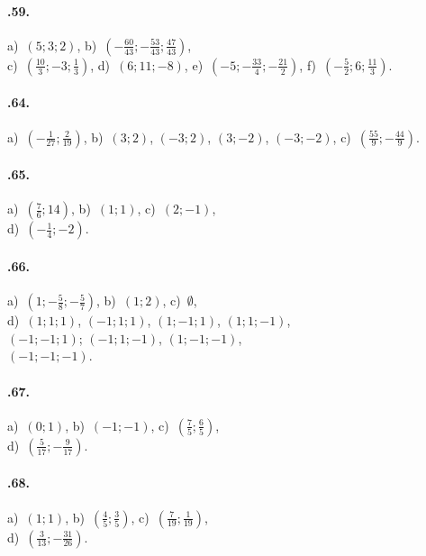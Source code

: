 \begin{multicols}{2}
\paragraph{\thechapter.59.} a)~$(5; 3; 2)$, b)~$\left(-{\frac{60}{43}};-\frac{53}{43};\frac{47}{43}\right)$,\protect\\ c)~$\left(\frac{10}{3};-3;\frac{1}{3}\right)$,
d)~$(6; 11; -8)$, e)~$\left(-5;-\frac{33}{4};-\frac{21}{2}\right)$, f)~$\left(-{\frac{5}{2}};6;\frac{11}{3}\right)$.

\paragraph{\thechapter.64.} a)~$\left(-{\frac{1}{27}};\frac{2}{19}\right)$, b)~$(3;2)$, $(-3;2)$, $(3;-2)$, $(-3;-2)$,
c)~$\left(\frac{55}{9};-\frac{44}{9}\right)$.

\paragraph{\thechapter.65.} a)~$\left(\frac{7}{6};14\right)$, b)~$\left(1;1\right)$, c)~$\left(2;-1\right)$, \protect\\d)~$\left(-{\frac{1}{4}};-2\right)$.

\paragraph{\thechapter.66.} a)~$\left(1;-\frac{5}{8};-\frac{5}{7}\right)$, b)~$(1;2)$, c)~$\emptyset $,\protect\\
d)~$(1;1;1)$, $(-1;1;1)$, $(1;-1;1)$, $(1;1;-1)$,\protect\\ $(-1;-1;1)$; $(-1;1;-1)$, $(1;-1;-1)$, \protect\\$(-1;-1;-1)$.

\paragraph{\thechapter.67.} a)~$(0;1)$, b)~$(-1;-1)$, c)~$\left(\frac{7}{5};\frac{6}{5}\right)$, \protect\\d)~$\left(\frac{5}{17};-\frac{9}{17}\right)$.

\paragraph{\thechapter.68.} a)~$\left(1;1\right)$, b)~$\left(\frac{4}{5};\frac{3}{5}\right)$, c)~$\left(\frac{7}{19};\frac{1}{19}\right)$,
\protect\\d)~$\left(\frac{3}{13};-\frac{31}{26}\right)$.


\end{multicols}
